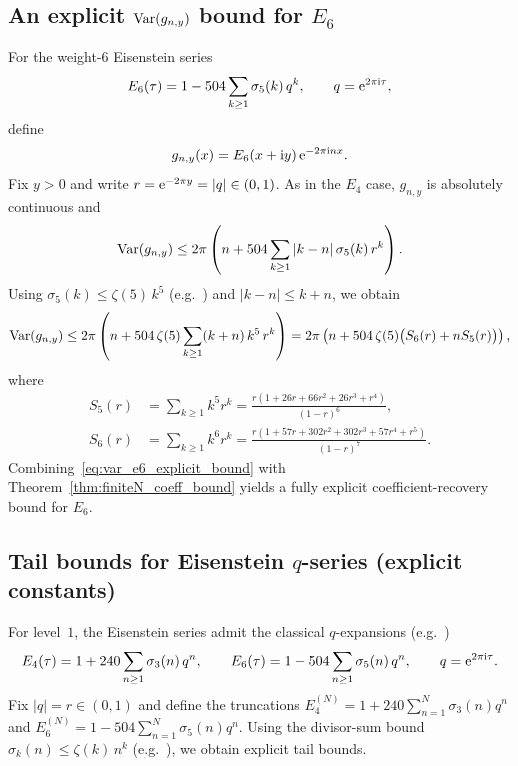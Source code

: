 \subsection{An explicit \texorpdfstring{$\mathrm{Var}(g_{n,y})$}{Var(g\_n,y)} bound for \texorpdfstring{$E_6$}{E6}}
\label{app:variation_bound_e6_explicit}

For the weight-$6$ Eisenstein series
\begin{equation}
E_6(\tau)=1-504\sum_{k\ge 1}\sigma_5(k)\,q^k,\qquad q=\mathrm{e}^{2\pi\mathrm{i}\tau},
\end{equation}
define
\begin{equation}
g_{n,y}(x)=E_6(x+\mathrm{i} y)\,\mathrm{e}^{-2\pi\mathrm{i} n x}.
\end{equation}
Fix $y>0$ and write $r=\mathrm{e}^{-2\pi y}=|q|\in(0,1)$. As in the $E_4$ case, $g_{n,y}$ is absolutely continuous and
\begin{equation}
\mathrm{Var}(g_{n,y})\le 2\pi\left(n+504\sum_{k\ge 1}|k-n|\,\sigma_5(k)\,r^k\right).
\end{equation}
Using $\sigma_5(k)\le \zeta(5)\,k^5$ (e.g.\ \cite{Apostol1990}) and $|k-n|\le k+n$, we obtain
\begin{equation}
\label{eq:var_e6_explicit_bound}
\mathrm{Var}(g_{n,y})
\le 2\pi\left(n+504\,\zeta(5)\sum_{k\ge 1}(k+n)\,k^5\,r^k\right)
=2\pi\left(n+504\,\zeta(5)\big(S_6(r)+nS_5(r)\big)\right),
\end{equation}
where
\begin{align}
S_5(r)&=\sum_{k\ge 1}k^5 r^k=\frac{r(1+26r+66r^2+26r^3+r^4)}{(1-r)^6},\\
S_6(r)&=\sum_{k\ge 1}k^6 r^k=\frac{r(1+57r+302r^2+302r^3+57r^4+r^5)}{(1-r)^7}.
\end{align}
Combining~\eqref{eq:var_e6_explicit_bound} with Theorem~\ref{thm:finiteN_coeff_bound} yields a fully explicit coefficient-recovery bound for $E_6$.

\subsection{Tail bounds for Eisenstein \texorpdfstring{$q$}{q}-series (explicit constants)}
\label{app:eisenstein_tail_bounds}

For level~$1$, the Eisenstein series admit the classical $q$-expansions (e.g.\ \cite{Apostol1990,DiamondShurman2005})
\begin{equation}
E_4(\tau)=1+240\sum_{n\ge 1}\sigma_3(n)\,q^n,
\qquad
E_6(\tau)=1-504\sum_{n\ge 1}\sigma_5(n)\,q^n,
\qquad q=\mathrm{e}^{2\pi\mathrm{i}\tau}.
\end{equation}
Fix $|q|=r\in(0,1)$ and define the truncations $E_{4}^{(N)}=1+240\sum_{n=1}^{N}\sigma_3(n)q^n$ and $E_{6}^{(N)}=1-504\sum_{n=1}^{N}\sigma_5(n)q^n$.
Using the divisor-sum bound $\sigma_k(n)\le \zeta(k)\,n^k$ (e.g.\ \cite{Apostol1990}), we obtain explicit tail bounds.

